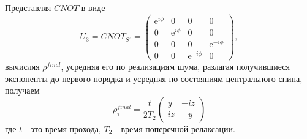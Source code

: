 \documentclass[a4paper,12pt]{article}
\theoremstyle{plain} %
\theoremstyle{definition} %
\theoremstyle{remark} %
\begin{document}
Представляя $CNOT$ в виде
\begin{equation}
    U_3 = CNOT_{S^z} = 
    \begin{pmatrix}
        \mathrm{e}^{i \phi} & 0 & 0 & 0 \\
        0 & \mathrm{e}^{i \phi} & 0 & 0 \\
        0 & 0 & 0 & \mathrm{e}^{-i \phi} \\
        0 & 0 & \mathrm{e}^{-i \phi} & 0
    \end{pmatrix},
\end{equation}
вычисляя $\rho^{final}$, усредняя его по реализациям шума, разлагая получившиеся экспоненты до первого порядка и усредняя по состояниям центрального спина, получаем
\begin{equation}
    \rho^{final}_\tau = \frac{t}{2T_2}
    \begin{pmatrix}
        y & - i z \\
        i z & - y
    \end{pmatrix}
\end{equation}
где $t$ - это время прохода, $T_2$ - время поперечной релаксации. 
\pagebreak



\end{document}

